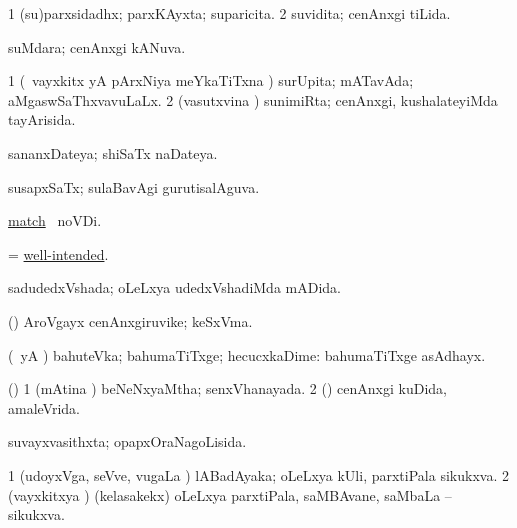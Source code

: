 \bentry
{} 
\gl{\gu}
\expl{}
\bmng
\bnum
\num{1} (su)parxsidadhx; parxKAyxta; suparicita. 
\num{2} suvidita; cenAnxgi tiLida. 
\enum
\emng
\eentry

\bentry
{} 
\gl{\gu}
\expl{}
\bmng
suMdara; cenAnxgi kANuva. 
\emng
\eentry

\bentry
{} 
\gl{\gu}
\expl{}
\bmng
\bnum
\num{1} (\kanmu\ vayxkitx yA pArxNiya meYkaTiTxna \vi) surUpita; mATavAda; aMgaswSaThxvavuLaLx. 
\num{2} (vasutxvina \vi) sunimiRta; cenAnxgi, kushalateyiMda tayArisida. 
\enum
\emng
\eentry

\bentry
{} 
\gl{\gu}
\expl{}
\bmng
sananxDateya; shiSaTx naDateya. 
\emng
\eentry

\bentry
{} 
\gl{\gu}
\expl{}
\bmng
susapxSaTx; sulaBavAgi gurutisalAguva. 
\emng
\eentry

\bentry
{} 
\gl{\gu}
\expl{}
\bmng
\hyperref{kandict_m.pdf}{M}{match(1)pagu}{match} \pagu\ noVDi. 
\emng
\eentry

\bentry
{} 
\gl{\gu}
\expl{}
\bmng
= \hyperlink{well-intended}{well-intended}. 
\emng
\eentry

\bentry
{} 
\gl{\gu}
\expl{}
\bmng
sadudedxVshada; oLeLxya udedxVshadiMda mADida. 
\emng
\eentry

\bentry
{} 
\gl{\nA}
\expl{}
\bmng
(\kanmu) AroVgayx cenAnxgiruvike; keSxVma. 
\emng
\eentry

\bentry
{} 
\gl{\kirxvi}
\expl{}
\bmng
(\pArxparx\ yA \alaMshA) bahuteVka; bahumaTiTxge; hecucxkaDime:  bahumaTiTxge asAdhayx. 
\emng
\eentry

\bentry
{} 
\gl{\gu}
\expl{}
\bmng
(\AmA) 
\bnum
\num{1} (mAtina \vi) beNeNxyaMtha; senxVhanayada. 
\num{2} (\ashi) cenAnxgi kuDida, amaleVrida. 
\enum
\emng
\eentry

\bentry
{} 
\gl{\gu}
\expl{}
\bmng
suvayxvasithxta; opapxOraNagoLisida. 
\emng
\eentry

\bentry
{} 
\gl{\gu}
\expl{}
\bmng
\bnum
\num{1} (udoyxVga, seVve, \mo vugaLa \vi) lABadAyaka; oLeLxya kUli, parxtiPala sikukxva. 
\num{2} (vayxkitxya \vi) (kelasakekx) oLeLxya parxtiPala, saMBAvane, saMbaLa -- sikukxva. 
\enum
\emng
\eentry

